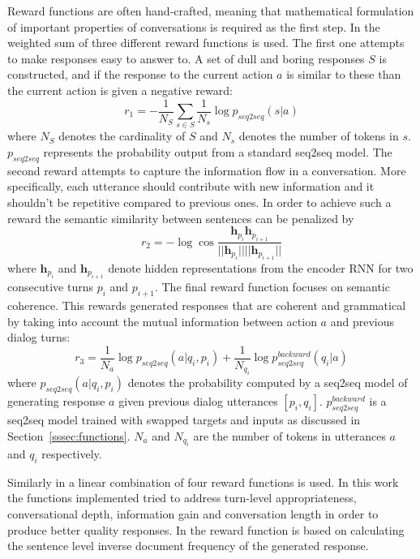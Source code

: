 \documentclass[12pt]{article}
\begin{document}
Reward functions are often hand-crafted, meaning that mathematical formulation of important properties of conversations is required as the first step. In \cite{Li_RL:2016} the weighted sum of three different reward functions is used. The first one attempts to make responses easy to answer to. A set of dull and boring responses \(S\) is constructed, and if the response to the current action \(a\) is similar to these than the current action is given a negative reward:
\begin{equation}
r_1=-\frac{1}{N_S}\sum_{s\in S}\frac{1}{N_s}\log{p_{seq2seq}(s|a)}
\end{equation}
where \(N_S\) denotes the cardinality of \(S\) and \(N_s\) denotes the number of tokens in \(s\). \(p_{seq2seq}\) represents the probability output from a standard seq2seq model. The second reward attempts to capture the information flow in a conversation. More specifically, each utterance should contribute with new information and it shouldn't be repetitive compared to previous ones. In order to achieve such a reward the semantic similarity between sentences can be penalized by
\begin{equation}
r_2=-\log{\cos{\frac{\bm{h}_{p_{i}} \bm{h}_{p_{i+1}}}{||\bm{h}_{p_{i}}|| ||\bm{h}_{p_{i+1}}|| }}}
\end{equation}
where \(\bm{h}_{p_{i}}\) and \(\bm{h}_{p_{i+1}}\) denote hidden representations from the encoder RNN for two consecutive turns \(p_i\) and \(p_{i+1}\). The final reward function focuses on semantic coherence. This rewards generated responses that are coherent and grammatical by taking into account the mutual information between action \(a\) and previous dialog turns:
\begin{equation}
r_3=\frac{1}{N_a}\log{p_{seq2seq}(a|q_i,p_i)}+\frac{1}{N_{q_i}}\log{p_{seq2seq}^{backward}(q_i|a)}
\end{equation}
where \(p_{seq2seq}(a|q_i,p_i)\) denotes the probability computed by a seq2seq model of generating response \(a\) given previous dialog utterances \([p_i,q_i]\). \(p_{seq2seq}^{backward}\) is a seq2seq model trained with swapped targets and inputs as discussed in Section~\ref{sssec:functions}. \(N_a\) and \(N_{q_i}\) are the number of tokens in utterances \(a\) and \(q_i\) respectively.

Similarly in \cite{Yu:2017} a linear combination of four reward functions is used. In this work the functions implemented tried to address turn-level appropriateness, conversational depth, information gain and conversation length in order to produce better quality responses. In \cite{Yao:2016} the reward function is based on calculating the sentence level inverse document frequency \cite{Salton:1988} of the generated response.
\end{document}
